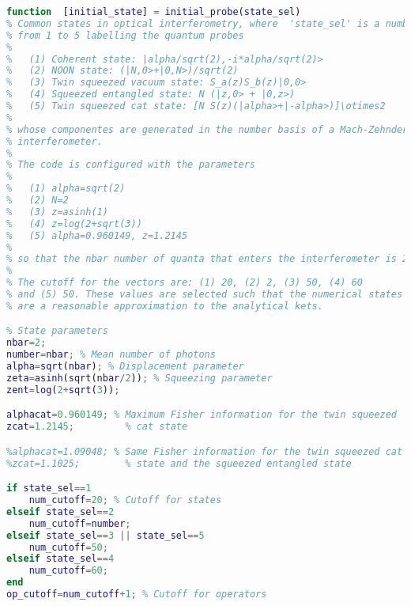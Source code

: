 \begin{lstlisting}[language=Matlab, mathescape=true]
function  [initial_state] = initial_probe(state_sel)
% Common states in optical interferometry, where  'state_sel' is a number
% from 1 to 5 labelling the quantum probes
%
%   (1) Coherent state: |alpha/sqrt(2),-i*alpha/sqrt(2)>
%   (2) NOON state: (|N,0>+|0,N>)/sqrt(2)
%   (3) Twin squeezed vacuum state: S_a(z)S_b(z)|0,0>
%   (4) Squeezed entangled state: N (|z,0> + |0,z>)
%   (5) Twin squeezed cat state: [N S(z)(|alpha>+|-alpha>)]\otimes2
%
% whose componentes are generated in the number basis of a Mach-Zehnder 
% interferometer.
%
% The code is configured with the parameters
%
%   (1) alpha=sqrt(2)
%   (2) N=2
%   (3) z=asinh(1)
%   (4) z=log(2+sqrt(3))
%   (5) alpha=0.960149, z=1.2145
%
% so that the nbar number of quanta that enters the interferometer is 2.
%
% The cutoff for the vectors are: (1) 20, (2) 2, (3) 50, (4) 60 
% and (5) 50. These values are selected such that the numerical states 
% are a reasonable approximation to the analytical kets.

% State parameters
nbar=2;
number=nbar; % Mean number of photons
alpha=sqrt(nbar); % Displacement parameter
zeta=asinh(sqrt(nbar/2)); % Squeezing parameter
zent=log(2+sqrt(3));

alphacat=0.960149; % Maximum Fisher information for the twin squeezed 
zcat=1.2145;         % cat state

%alphacat=1.09048; % Same Fisher information for the twin squeezed cat 
%zcat=1.1025;        % state and the squeezed entangled state

if state_sel==1
    num_cutoff=20; % Cutoff for states
elseif state_sel==2
    num_cutoff=number;
elseif state_sel==3 || state_sel==5
    num_cutoff=50;
elseif state_sel==4
    num_cutoff=60;
end
op_cutoff=num_cutoff+1; % Cutoff for operators


\end{lstlisting}
